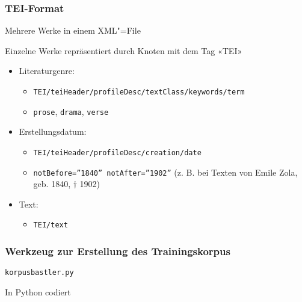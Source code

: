 \documentclass[t]{beamer} %
\begin{document}
\begin{frame}
  \frametitle{TEI-Format}
  Mehrere Werke in einem XML"=File
  \vspace*{1ex}
  
  Einzelne Werke repräsentiert durch Knoten mit dem Tag «TEI»
  \begin{itemize}
  \item Literaturgenre:
    \begin{itemize}
    \item \texttt{TEI/teiHeader/profileDesc/textClass/keywords/term}    
    \item \texttt{prose}, \texttt{drama}, \texttt{verse}
    \end{itemize}
    \vspace*{1ex}
    \pause
    
  \item Erstellungsdatum: 
    \begin{itemize}
    \item \texttt{TEI/teiHeader/profileDesc/creation/date}   
    \item \texttt{notBefore=''1840'' notAfter=''1902''} (z. B. bei Texten von Emile Zola, geb. 1840, $\dagger$ 1902)
    \end{itemize}
    \vspace*{1ex}
    \pause
    
  \item Text:\\
    \begin{itemize}
    \item \texttt{TEI/text}
    \end{itemize}
  \end{itemize}
\end{frame}

\begin{frame}
  \frametitle{Werkzeug zur Erstellung des Trainingskorpus}
  \texttt{korpusbastler.py}
  \vspace*{1ex}
  
  In Python codiert
%  
%  
\end{frame}
\end{document}
